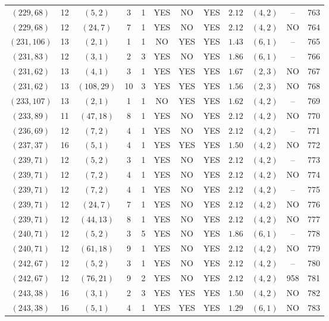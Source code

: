 \begin{longtable}{|c|c|c|c|c|c|c|c|c|c|c|c|}
$(229,68)$ & 12 & $(5,2)$ & 3 & 1 & YES & NO & YES & $2.12$ & $(4,2)$ & -- & 763\\
$(229,68)$ & 12 & $(24,7)$ & 7 & 1 & YES & NO & YES & $2.12$ & $(4,2)$ & NO & 764\\
$(231,106)$ & 13 & $(2,1)$ & 1 & 1 & NO & YES & YES & $1.43$ & $(6,1)$ & -- & 765\\
$(231,83)$ & 12 & $(3,1)$ & 2 & 3 & YES & NO & YES & $1.86$ & $(6,1)$ & -- & 766\\
$(231,62)$ & 13 & $(4,1)$ & 3 & 1 & YES & YES & YES & $1.67$ & $(2,3)$ & NO & 767\\
$(231,62)$ & 13 & $(108,29)$ & 10 & 3 & YES & YES & YES & $1.56$ & $(2,3)$ & NO & 768\\
$(233,107)$ & 13 & $(2,1)$ & 1 & 1 & NO & YES & YES & $1.62$ & $(4,2)$ & -- & 769\\
$(233,89)$ & 11 & $(47,18)$ & 8 & 1 & YES & NO & YES & $2.12$ & $(4,2)$ & NO & 770\\
$(236,69)$ & 12 & $(7,2)$ & 4 & 1 & YES & NO & YES & $2.12$ & $(4,2)$ & -- & 771\\
$(237,37)$ & 16 & $(5,1)$ & 4 & 1 & YES & YES & YES & $1.50$ & $(4,2)$ & NO & 772\\
$(239,71)$ & 12 & $(5,2)$ & 3 & 1 & YES & NO & YES & $2.12$ & $(4,2)$ & -- & 773\\
$(239,71)$ & 12 & $(7,2)$ & 4 & 1 & YES & NO & YES & $2.12$ & $(4,2)$ & NO & 774\\
$(239,71)$ & 12 & $(7,2)$ & 4 & 1 & YES & NO & YES & $2.12$ & $(4,2)$ & -- & 775\\
$(239,71)$ & 12 & $(24,7)$ & 7 & 1 & YES & NO & YES & $2.12$ & $(4,2)$ & NO & 776\\
$(239,71)$ & 12 & $(44,13)$ & 8 & 1 & YES & NO & YES & $2.12$ & $(4,2)$ & NO & 777\\
$(240,71)$ & 12 & $(5,2)$ & 3 & 5 & YES & NO & YES & $1.86$ & $(6,1)$ & -- & 778\\
$(240,71)$ & 12 & $(61,18)$ & 9 & 1 & YES & NO & YES & $2.12$ & $(4,2)$ & NO & 779\\
$(242,67)$ & 12 & $(5,2)$ & 3 & 1 & YES & NO & YES & $2.12$ & $(4,2)$ & -- & 780\\
$(242,67)$ & 12 & $(76,21)$ & 9 & 2 & YES & NO & YES & $2.12$ & $(4,2)$ & 958 & 781\\
$(243,38)$ & 16 & $(3,1)$ & 2 & 3 & YES & YES & YES & $1.50$ & $(4,2)$ & NO & 782\\
$(243,38)$ & 16 & $(5,1)$ & 4 & 1 & YES & YES & YES & $1.29$ & $(6,1)$ & NO & 783\\

\end{longtable}
